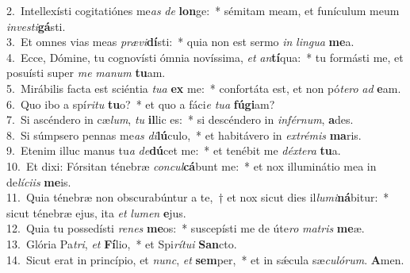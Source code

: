 {2.~}Intellexísti cogitatiónes me\textit{as} \textit{de} \textbf{lon}ge:~* sémitam meam, et funículum meum \textit{in}\textit{ve}\textit{sti}\textbf{gá}sti.\\
{3.~}Et omnes vias meas \textit{præ}\textit{vi}\textbf{dí}sti:~* quia non est sermo \textit{in} \textit{lin}\textit{gua} \textbf{me}a.\\
{4.~}Ecce, Dómine, tu cognovísti ómnia novíssima, \textit{et} \textit{an}\textbf{tí}qua:~* tu formásti me, et posuísti super \textit{me} \textit{ma}\textit{num} \textbf{tu}am.\\
{5.~}Mirábilis facta est sciéntia \textit{tu}\textit{a} \textbf{ex} me:~* confortáta est, et non pó\textit{te}\textit{ro} \textit{ad} \textbf{e}am.\\
{6.~}Quo ibo a spí\textit{ri}\textit{tu} \textbf{tu}o?~* et quo a fáci\textit{e} \textit{tu}\textit{a} \textbf{fú}\textbf{gi}am?\\
{7.~}Si ascéndero in cæ\textit{lum}, \textit{tu} \textbf{il}lic es:~* si descéndero in \textit{in}\textit{fér}\textit{num}, \textbf{a}des.\\
{8.~}Si súmpsero pennas me\textit{as} \textit{di}\textbf{lú}culo,~* et habitávero in \textit{ex}\textit{tré}\textit{mis} \textbf{ma}ris.\\
{9.~}Etenim illuc manus tu\textit{a} \textit{de}\textbf{dú}cet me:~* et tenébit me \textit{déx}\textit{te}\textit{ra} \textbf{tu}a.\\
{10.~}Et dixi: Fórsitan ténebræ \textit{con}\textit{cul}\textbf{cá}bunt me:~* et nox illuminátio mea in de\textit{lí}\textit{ci}\textit{is} \textbf{me}is.\\
{11.~}Quia ténebræ non obscurabúntur a te,~† et nox sicut dies il\textit{lu}\textit{mi}\textbf{ná}bitur:~* sicut ténebræ ejus, ita \textit{et} \textit{lu}\textit{men} \textbf{e}jus.\\
{12.~}Quia tu possedísti \textit{re}\textit{nes} \textbf{me}os:~* suscepísti me de úte\textit{ro} \textit{ma}\textit{tris} \textbf{me}æ.\\
{13.~}Glória Pa\textit{tri}, \textit{et} \textbf{Fí}lio,~* et Spi\textit{rí}\textit{tu}\textit{i} \textbf{San}cto.\\
{14.~}Sicut erat in princípio, et \textit{nunc}, \textit{et} \textbf{sem}per,~* et in sǽcula sæ\textit{cu}\textit{ló}\textit{rum}. \textbf{A}men.\\
